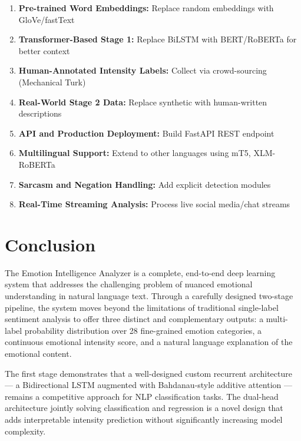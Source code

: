 \documentclass[12pt, a4paper]{report}
\begin{document}
\begin{enumerate}
    \item \textbf{Pre-trained Word Embeddings:} Replace random embeddings with GloVe/fastText
    \item \textbf{Transformer-Based Stage 1:} Replace BiLSTM with BERT/RoBERTa for better context
    \item \textbf{Human-Annotated Intensity Labels:} Collect via crowd-sourcing (Mechanical Turk)
    \item \textbf{Real-World Stage 2 Data:} Replace synthetic with human-written descriptions
    \item \textbf{API and Production Deployment:} Build FastAPI REST endpoint
    \item \textbf{Multilingual Support:} Extend to other languages using mT5, XLM-RoBERTa
    \item \textbf{Sarcasm and Negation Handling:} Add explicit detection modules
    \item \textbf{Real-Time Streaming Analysis:} Process live social media/chat streams
\end{enumerate}

\chapter{Conclusion}

The Emotion Intelligence Analyzer is a complete, end-to-end deep learning system that addresses the challenging problem of nuanced emotional understanding in natural language text. Through a carefully designed two-stage pipeline, the system moves beyond the limitations of traditional single-label sentiment analysis to offer three distinct and complementary outputs: a multi-label probability distribution over 28 fine-grained emotion categories, a continuous emotional intensity score, and a natural language explanation of the emotional content.

The first stage demonstrates that a well-designed custom recurrent architecture — a Bidirectional LSTM augmented with Bahdanau-style additive attention — remains a competitive approach for NLP classification tasks. The dual-head architecture jointly solving classification and regression is a novel design that adds interpretable intensity prediction without significantly increasing model complexity.
\end{document}
